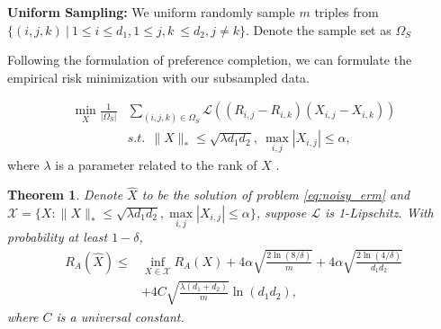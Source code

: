 \documentclass{article}
\numberwithin{equation}{section}
\newtheorem{theorem}{Theorem}
\newtheorem{sampling strategy}{Sampling Strategy}
\begin{document}
\textbf{Uniform Sampling:} We uniform randomly sample $m$ triples from $\{(i,j,k)~|~ 1 \leq i \leq d_1, 1 \leq j, k\ \leq d_2, j \neq k \}$. Denote the sample set as $\Omega_S$

Following the formulation of preference completion, we can formulate the empirical risk minimization with our subsampled data.

\begin{equation}
\begin{aligned}
    \underset{X}{\min}  \frac{1}{|\Omega_S|} & \sum_{(i,j,k) \in \Omega_S}  \mathcal{L}( (R_{i,j} - R_{i,k})(X_{i,j} - X_{i,k}) ) \\
    & s.t. ~~ \|X\|_* \leq \sqrt{\lambda d_1 d_2},~ \max_{i,j} |X_{i,j}| \leq \alpha,
    \label{eq:noisy_erm}
\end{aligned}
\end{equation}
where $\lambda$ is a parameter related to the rank of $X$ \cite{cr}.

\begin{theorem}
Denote $\hat{X}$ to be the solution of problem \ref{eq:noisy_erm} and $\mathcal{X} = \{X: \|X\|_* \leq \sqrt{\lambda d_1 d_2}, \underset{i,j}{\max} |X_{i,j}| \leq \alpha \}$, suppose $\mathcal{L}$ is 1-Lipschitz.  With probability at least $1 - \delta$,
\begin{equation}
\begin{aligned}
R_A(\hat{X}) \leq & \underset{X\in \mathcal{X}}{\inf} R_A(X) + 4 \alpha \sqrt{\frac{2\ln(8/\delta)}{m}} + 4\alpha \sqrt{ \frac{2\ln(4/\delta) }{d_1 d_2} } \\
        & + 4 C \sqrt{\frac{\lambda (d_1 + d_2)}{m}} \ln(d_1 d_2),
\end{aligned}
\end{equation} 
where $C$ is a universal constant.
\label{thm:noisy}
\end{theorem}
\end{document}
